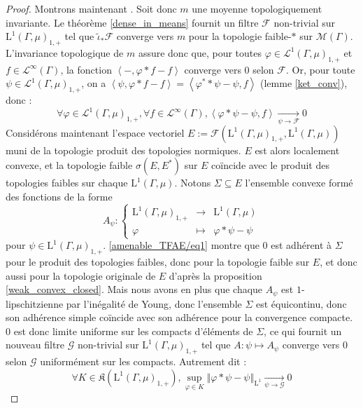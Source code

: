 \documentclass[a4paper,12pt]{article}
\newcommand{\norm}[1]{\left\Vert #1\right\Vert}
\newcommand{\ket}[1]{\left\langle #1 \right\rangle}
\newcommand\fundef[3]{#1: \left\{\begin{array}{ccc}#2\\#3\end{array}\right.}
\renewcommand{\implies}{\Rightarrow}
\newcommand{\blank}{{-}}
\newcommand{\TODO}[1]{}%
\begin{document}
\begin{proof}
    Montrons maintenant \framebox{$(\ref{amenable_TFAE/topological_mean})\implies(\ref{amenable_TFAE/strong_Reiter})$}. Soit donc $m$ une moyenne topologiquement invariante.
    Le théorème \ref{dense_in_means} fournit un filtre $\mathscr{F}$ non-trivial sur $\mathrm{L}^1(\Gamma, \mu)_{1, +}$
    tel que $\widetilde{\iota}_*\mathscr{F}$ converge vers $m$ pour la topologie faible-$*$ sur $\mathcal{M}(\Gamma)$.
    L'invariance topologique de $m$ assure donc que, pour toutes $\varphi\in\mathscr{L}^1(\Gamma, \mu)_{1, +}$ et 
    $f\in\mathscr{L}^\infty(\Gamma)$, la fonction $\ket{\blank, \varphi\ast f - f}$ converge vers $0$ selon $\mathscr{F}$.
    Or, pour toute $\psi\in\mathscr{L}^1(\Gamma, \mu)_{1, +}$, on a $\ket{\psi, \varphi\ast f - f} = \ket{\varphi^*\ast\psi - \psi, f}$ (lemme \ref{ket_conv}),
    donc :
    \begin{equation}\label{amenable_TFAE/eq1}
        \forall\varphi\in\mathscr{L}^1(\Gamma, \mu)_{1, +}, \forall f\in\mathscr{L}^\infty(\Gamma), \ket{\varphi\ast\psi - \psi, f}\xrightarrow[\psi\to\mathscr{F}]{}0
    \end{equation}
    Considérons maintenant l'espace vectoriel $E := \mathcal{F}(\mathrm{L}^1(\Gamma, \mu)_{1, +}, \mathrm{L}^1(\Gamma, \mu))$ muni de la topologie 
    produit des topologies normiques. $E$ est alors localement convexe, et la topologie faible $\sigma(E, E^*)$ sur $E$
    coïncide avec le produit des topologies faibles sur chaque $\mathrm{L}^1(\Gamma, \mu)$. \TODO{explication ?} Notons $\Sigma\subseteq E$ l'ensemble convexe formé
    des fonctions de la forme 
    \begin{equation*}
        \fundef{A_\psi}{\mathrm{L}^1(\Gamma, \mu)_{1, +}&\to&\mathrm{L}^1(\Gamma, \mu)}{\varphi&\mapsto&\varphi\ast\psi - \psi}
    \end{equation*}
    pour $\psi\in\mathrm{L}^1(\Gamma, \mu)_{1, +}$.
    \eqref{amenable_TFAE/eq1} montre que $0$ est adhérent à $\Sigma$ pour le produit des topologies faibles, 
    donc pour la topologie faible sur $E$, et donc aussi pour la topologie originale de $E$ d'après la proposition \ref{weak_convex_closed}.
    Mais nous avons en plus que chaque $A_\psi$ est $1$-lipschitzienne par l'inégalité de Young, donc l'ensemble
    $\Sigma$ est équicontinu, donc son adhérence simple coïncide avec son adhérence pour la convergence compacte.
    $0$ est donc limite uniforme sur les compacts d'éléments de $\Sigma$, ce qui fournit un nouveau filtre $\mathscr{G}$ non-trivial sur $\mathrm{L}^1(\Gamma, \mu)_{1, +}$ 
    tel que $A:\psi\mapsto A_\psi$ converge vers $0$ selon $\mathscr{G}$ uniformément sur les compacts. Autrement dit :
    \begin{equation}\label{amenable_TFAE/eq2}
        \forall K\in\mathfrak{K}(\mathrm{L}^1(\Gamma, \mu)_{1, +}), \sup_{\varphi\in K}\norm{\varphi\ast\psi - \psi}_{\mathrm{L}^1} \xrightarrow[\psi\to\mathscr{G}]{} 0
    \end{equation}


\end{proof}
\end{document}
